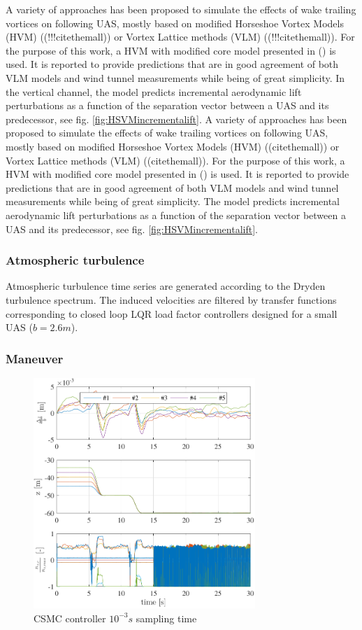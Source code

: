 \documentclass{ifacconf}
\begin{document}
A variety of approaches has been proposed to simulate the effects of wake trailing vortices on following UAS, mostly based on modified Horseshoe Vortex Models (HVM) ((!!!citethemall)) or Vortex Lattice methods (VLM) ((!!!citethemall)). For the purpose of this work, a HVM with modified core model presented in (\cite{dogan2005modeling}) is used. It is reported to provide predictions that are in good agreement of both VLM models and wind tunnel measurements while being of great simplicity. In the vertical channel, the model predicts incremental aerodynamic lift perturbations as a function of the separation vector between a UAS and its predecessor, see fig. \ref{fig:HSVMincrementalift}.
A variety of approaches has been proposed to simulate the effects of wake trailing vortices on following UAS, mostly based on modified Horseshoe Vortex Models (HVM) ((citethemall)) or Vortex Lattice methods (VLM) ((citethemall)). For the purpose of this work, a HVM with modified core model presented in (\cite{dogan2005modeling}) is used. It is reported to provide predictions that are in good agreement of both VLM models and wind tunnel measurements while being of great simplicity. The model predicts incremental aerodynamic lift perturbations as a function of the separation vector between a UAS and its predecessor, see fig. \ref{fig:HSVMincrementalift}.

\subsubsection{Atmospheric turbulence}
Atmospheric turbulence time series are generated according to the Dryden turbulence spectrum. The induced velocities are filtered by transfer functions corresponding to closed loop LQR load factor controllers designed for a small UAS ($b=2.6m$).

\subsubsection{Maneuver}

\begin{figure}
\begin{center}
\includegraphics[width=8.4cm]{STSMC-1000Hz-TIMESCALESEPARATION-turbulence=1}    %
\caption{CSMC controller $10^{-3} s$ sampling time}
\label{fig:CSMC1000Hz}
\end{center}
\end{figure}
\end{document}
